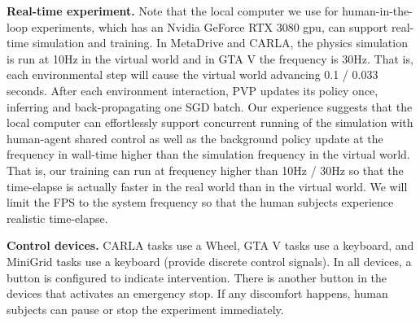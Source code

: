 \textbf{Real-time experiment.}
Note that the local computer we use for human-in-the-loop experiments, which has an Nvidia GeForce RTX 3080 gpu, can support real-time simulation and training. 
In MetaDrive and CARLA, the physics simulation is run at 10Hz in the virtual world and in GTA V the frequency is 30Hz. That is, each environmental step will cause the virtual world advancing 0.1 / 0.033 seconds.
After each environment interaction, PVP updates its policy once, inferring and back-propagating one SGD batch.
Our experience suggests that the local computer can effortlessly support concurrent running of the simulation with human-agent shared control as well as the background policy update at the frequency in wall-time higher than the simulation frequency in the virtual world. 
That is, our training can run at frequency higher than 10Hz / 30Hz so that the time-elapse is actually faster in the real world than in the virtual world. We will limit the FPS to the system frequency so that the human subjects experience realistic time-elapse.

\textbf{Control devices.}
CARLA tasks use a Wheel, GTA V tasks use a keyboard, and MiniGrid tasks use a keyboard (provide discrete control signals). In all devices, a button is configured to indicate intervention. There is another button in the devices that activates an emergency stop. If any discomfort happens, human subjects can pause or stop the experiment immediately.









